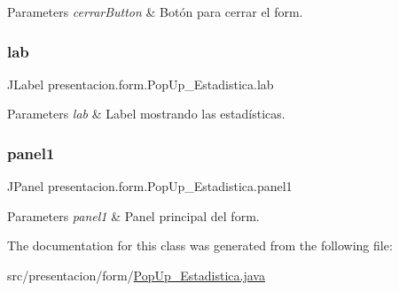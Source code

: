 \begin{DoxyParams}{Parameters}
{\em cerrar\+Button} & Botón para cerrar el form. \\
\hline
\end{DoxyParams}
\mbox{\label{classpresentacion_1_1form_1_1PopUp__Estadistica_ac61ead9dea9a28c411062fdc951b4df8}} 
\subsubsection{\texorpdfstring{lab}{lab}}
{\footnotesize\ttfamily J\+Label presentacion.\+form.\+Pop\+Up\+\_\+\+Estadistica.\+lab\hspace{0.3cm}{\ttfamily [private]}}


\begin{DoxyParams}{Parameters}
{\em lab} & Label mostrando las estadísticas. \\
\hline
\end{DoxyParams}
\mbox{\label{classpresentacion_1_1form_1_1PopUp__Estadistica_ac276266d42b873f89883dd3a869feadf}} 
\subsubsection{\texorpdfstring{panel1}{panel1}}
{\footnotesize\ttfamily J\+Panel presentacion.\+form.\+Pop\+Up\+\_\+\+Estadistica.\+panel1}


\begin{DoxyParams}{Parameters}
{\em panel1} & Panel principal del form. \\
\hline
\end{DoxyParams}


The documentation for this class was generated from the following file\+:\begin{DoxyCompactItemize}
\item 
src/presentacion/form/\hyperlink{PopUp__Estadistica_8java}{Pop\+Up\+\_\+\+Estadistica.\+java}\end{DoxyCompactItemize}
